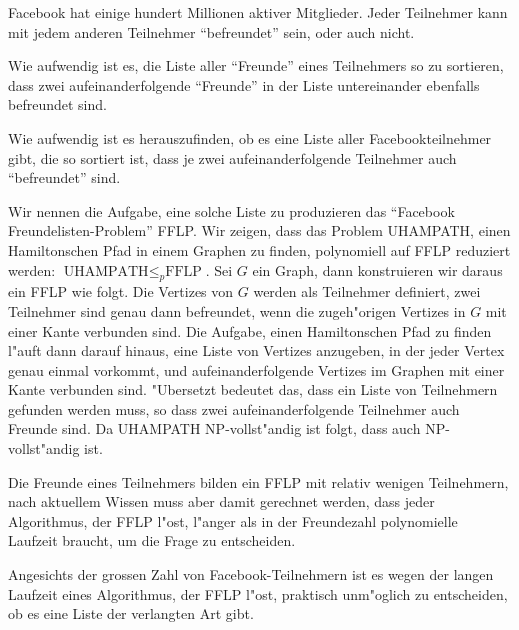 Facebook hat einige hundert Millionen aktiver Mitglieder.
Jeder Teilnehmer kann mit jedem anderen Teilnehmer ``befreundet''
sein, oder auch nicht.
\begin{teilaufgaben}
\item
Wie aufwendig ist es, die Liste aller ``Freunde''
eines Teilnehmers so zu sortieren, dass zwei aufeinanderfolgende ``Freunde''
in der Liste untereinander ebenfalls befreundet sind.
\item
Wie aufwendig
ist es herauszufinden, ob es eine Liste aller Facebookteilnehmer gibt,
die so sortiert ist, dass je zwei aufeinanderfolgende Teilnehmer
auch ``befreundet'' sind.
\end{teilaufgaben}

\begin{loesung}
Wir nennen die Aufgabe, eine solche Liste zu produzieren das ``Facebook
Freundelisten-Problem'' FFLP. Wir zeigen, dass das Problem
UHAMPATH, einen Hamiltonschen Pfad in einem Graphen zu finden,
polynomiell auf FFLP reduziert werden:
$\text{UHAMPATH}\le_p\text{FFLP}$.
Sei $G$ ein Graph, dann konstruieren wir daraus ein FFLP wie
folgt. Die Vertizes von $G$ werden als Teilnehmer definiert,
zwei Teilnehmer sind genau dann befreundet, wenn die zugeh"origen
Vertizes in $G$ mit einer Kante verbunden sind. Die Aufgabe, einen
Hamiltonschen Pfad zu finden l"auft dann darauf hinaus, eine Liste
von Vertizes anzugeben, in der jeder Vertex genau einmal vorkommt,
und aufeinanderfolgende Vertizes im Graphen mit einer Kante verbunden
sind. "Ubersetzt bedeutet das, dass ein Liste von Teilnehmern gefunden
werden muss, so dass zwei aufeinanderfolgende Teilnehmer auch Freunde sind.
Da UHAMPATH NP-vollst"andig ist folgt, dass auch  NP-vollst"andig
ist.
\begin{teilaufgaben}
\item Die Freunde eines Teilnehmers bilden ein FFLP mit relativ wenigen
Teilnehmern, nach aktuellem Wissen muss aber damit gerechnet werden,
dass jeder Algorithmus, der FFLP l"ost, l"anger als in der Freundezahl
polynomielle Laufzeit braucht, um die Frage zu entscheiden.
\item Angesichts der grossen Zahl von Facebook-Teilnehmern ist es
wegen der langen Laufzeit eines Algorithmus, der FFLP l"ost,
praktisch unm"oglich zu entscheiden, ob es eine Liste der verlangten
Art gibt.
\end{teilaufgaben}
\end{loesung}
